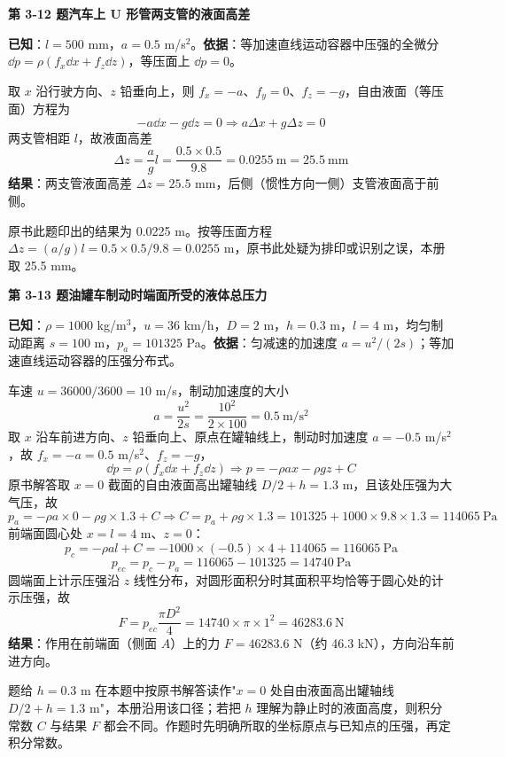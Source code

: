 \noindent\textbf{第 3-12 题\quad 汽车上 U 形管两支管的液面高差}

\begin{jie}
\textbf{已知}：$l=500$ mm，$a=0.5$ m/s$^2$。\textbf{依据}：等加速直线运动容器中压强的全微分 $\dd p=\rho(f_x\dd x+f_z\dd z)$，等压面上 $\dd p=0$。

取 $x$ 沿行驶方向、$z$ 铅垂向上，则 $f_x=-a$、$f_y=0$、$f_z=-g$，自由液面（等压面）方程为
\[ -a\dd x-g\dd z=0\Rightarrow a\Delta x+g\Delta z=0 \]
两支管相距 $l$，故液面高差
\[ \Delta z=\frac{a}{g}l=\frac{0.5\times0.5}{9.8}=0.0255\ \mathrm{m}=25.5\ \mathrm{mm} \]
\textbf{结果}：两支管液面高差 $\Delta z=25.5$ mm，后侧（惯性方向一侧）支管液面高于前侧。
\end{jie}

\begin{tishi}
原书此题印出的结果为 0.0225 m。按等压面方程 $\Delta z=(a/g)l=0.5\times0.5/9.8=0.0255$ m，原书此处疑为排印或识别之误，本册取 25.5 mm。
\end{tishi}

\noindent\textbf{第 3-13 题\quad 油罐车制动时端面所受的液体总压力}

\begin{jie}
\textbf{已知}：$\rho=1000$ kg/m$^3$，$u=36$ km/h，$D=2$ m，$h=0.3$ m，$l=4$ m，均匀制动距离 $s=100$ m，$p_a=101325$ Pa。\textbf{依据}：匀减速的加速度 $a=u^2/(2s)$；等加速直线运动容器的压强分布式。

车速 $u=36000/3600=10$ m/s，制动加速度的大小
\[ a=\frac{u^2}{2s}=\frac{10^2}{2\times100}=0.5\ \mathrm{m/s^2} \]
取 $x$ 沿车前进方向、$z$ 铅垂向上、原点在罐轴线上，制动时加速度 $a=-0.5$ m/s$^2$，故 $f_x=-a=0.5$ m/s$^2$、$f_z=-g$，
\[ \dd p=\rho(f_x\dd x+f_z\dd z)\Rightarrow p=-\rho ax-\rho gz+C \]
原书解答取 $x=0$ 截面的自由液面高出罐轴线 $D/2+h=1.3$ m，且该处压强为大气压，故
\[ p_a=-\rho a\times0-\rho g\times1.3+C\Rightarrow C=p_a+\rho g\times1.3=101325+1000\times9.8\times1.3=114065\ \mathrm{Pa} \]
前端面圆心处 $x=l=4$ m、$z=0$：
\[ p_{c}=-\rho al+C=-1000\times(-0.5)\times4+114065=116065\ \mathrm{Pa} \]
\[ p_{ec}=p_{c}-p_a=116065-101325=14740\ \mathrm{Pa} \]
圆端面上计示压强沿 $z$ 线性分布，对圆形面积分时其面积平均恰等于圆心处的计示压强，故
\[ F=p_{ec}\frac{\pi D^2}{4}=14740\times\pi\times1^2=46283.6\ \mathrm{N} \]
\textbf{结果}：作用在前端面（侧面 $A$）上的力 $F=46283.6$ N（约 46.3 kN），方向沿车前进方向。
\end{jie}

\begin{yicuo}
题给 $h=0.3$ m 在本题中按原书解答读作"$x=0$ 处自由液面高出罐轴线 $D/2+h=1.3$ m"，本册沿用该口径；若把 $h$ 理解为静止时的液面高度，则积分常数 $C$ 与结果 $F$ 都会不同。作题时先明确所取的坐标原点与已知点的压强，再定积分常数。
\end{yicuo}

